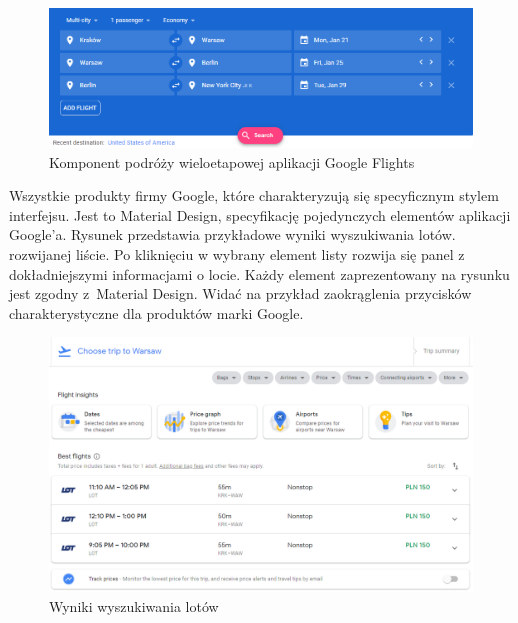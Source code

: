 \documentclass[12pt, twoside]{report}
\begin{document}
\begin{figure}[!ht]
\centering
\includegraphics[scale=0.60, keepaspectratio]{google_flights_multi.png}
\caption{Komponent podróży wieloetapowej aplikacji Google Flights}
\label{fig:google_flights_multi}
\end{figure}
Wszystkie produkty firmy Google, które  charakteryzują się specyficznym stylem interfejsu. Jest to  Material Design,  specyfikację pojedynczych elementów aplikacji Google'a. Rysunek  przedstawia przykładowe wyniki wyszukiwania lotów.  rozwijanej liście. Po kliknięciu w wybrany element listy rozwija się panel z dokładniejszymi informacjami o locie. Każdy element zaprezentowany na  rysunku jest zgodny z~Material Design. Widać na przykład zaokrąglenia przycisków charakterystyczne dla produktów marki Google. 

 
\begin{figure}[!ht]
\centering
\includegraphics[scale=0.50, keepaspectratio]{google_flights_result.png}
\caption{Wyniki wyszukiwania lotów}
\label{fig:google_flights_result}
\end{figure}
\end{document}
